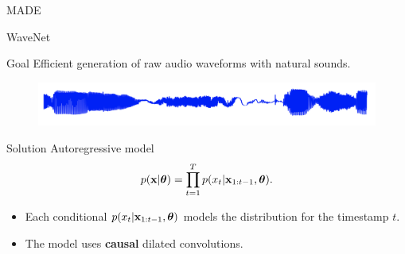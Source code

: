 \begin{frame}{MADE}
\begin{minipage}[t]{0.41\columnwidth}
\begin{figure}
		\end{figure}
	\end{minipage}
\end{frame}
\begin{frame}{WaveNet}
	\begin{block}{Goal}
		Efficient generation of raw audio waveforms with natural sounds.
	\end{block}
	\begin{figure}
	  \centering
	  \includegraphics[width=0.9\linewidth]{figs/wavenet_ex.png}
	\end{figure}
	\begin{block}{Solution}
		Autoregressive model
		\vspace{-0.3cm}
		\[
		    p(\mathbf{x}| \boldsymbol{\theta}) = \prod_{t=1}^T p(x_t|\mathbf{x}_{1:t-1}, \boldsymbol{\theta}).
		\]
		\vspace{-0.3cm}
	\end{block}
	\begin{itemize}
		\item Each conditional $p(x_t|\mathbf{x}_{1:t-1}, \boldsymbol{\theta})$ models the distribution for the timestamp $t$.
		\item The model uses \textbf{causal} dilated convolutions.
	\end{itemize}
\end{frame}
